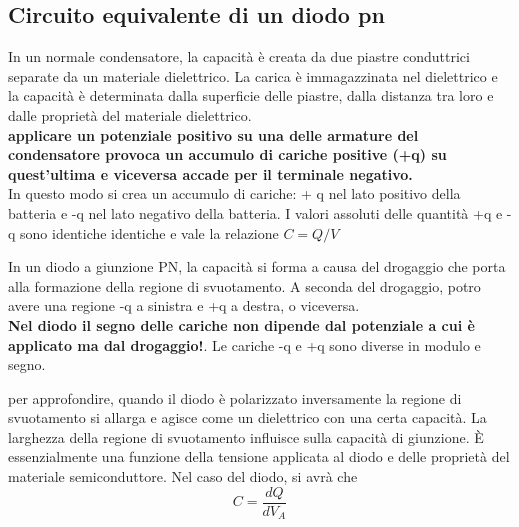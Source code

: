 \subsection{Circuito equivalente di un diodo pn}
\begin{psbox}
    In un normale condensatore, la capacità è creata da due piastre conduttrici separate da un materiale dielettrico. La carica è immagazzinata nel dielettrico e la capacità è determinata dalla superficie delle piastre, dalla distanza tra loro e dalle proprietà del materiale dielettrico.\\
    
    \textbf{applicare un potenziale positivo su una delle armature del condensatore provoca un accumulo di cariche positive (+q) su quest'ultima e viceversa accade per il terminale negativo.}\\
    In questo modo si crea un accumulo di cariche: + q nel lato positivo della batteria e -q nel lato negativo della batteria.
    I valori assoluti delle quantità +q e - q sono identiche identiche e vale la relazione  $C=Q/V$
    \begin{center}
    \end{center}
    In un diodo a giunzione PN, la capacità si forma a causa del drogaggio che porta alla formazione della regione di svuotamento.
    A seconda del drogaggio, potro avere una regione -q a sinistra e +q a destra, o viceversa.\\ \textbf{Nel diodo il segno delle cariche non dipende dal potenziale a cui è applicato ma dal drogaggio!}. Le cariche -q e +q sono diverse in modulo e segno.
    \begin{center}
    \end{center}
    per approfondire, quando il diodo è polarizzato inversamente la regione di svuotamento si allarga e agisce come un dielettrico con una certa capacità. La larghezza della regione di svuotamento influisce sulla capacità di giunzione. È essenzialmente una funzione della tensione applicata al diodo e delle proprietà del materiale semiconduttore.
    Nel caso del diodo, si avrà che \[ C = \dfrac{dQ}{dV_A}\]
\end{psbox}

